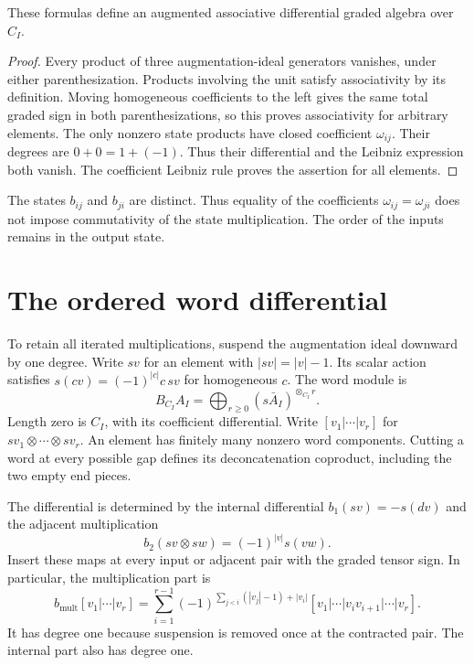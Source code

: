 \begin{proposition}\label{prop:ocb-coefficient-algebra}
These formulas define an augmented associative differential graded
algebra over $C_I$.
\end{proposition}

\begin{proof}
Every product of three augmentation-ideal generators vanishes,
under either parenthesization.
Products involving the unit satisfy associativity by its definition.
Moving homogeneous coefficients to the left gives the same total
graded sign in both parenthesizations, so this proves associativity
for arbitrary elements.
The only nonzero state products have closed coefficient $\omega_{ij}$.
Their degrees are $0+0=1+(-1)$.
Thus their differential and the Leibniz expression both vanish.
The coefficient Leibniz rule proves the assertion for all elements.
\end{proof}

The states $b_{ij}$ and $b_{ji}$ are distinct.
Thus equality of the coefficients $\omega_{ij}=\omega_{ji}$ does
not impose commutativity of the state multiplication.
The order of the inputs remains in the output state.

\section{The ordered word differential}

To retain all iterated multiplications, suspend the augmentation
ideal downward by one degree.
Write $sv$ for an element with $|sv|=|v|-1$.
Its scalar action satisfies
$s(cv)=(-1)^{|c|}c\,sv$ for homogeneous $c$.
The word module is
\[
 B_{C_I}A_I=\bigoplus_{r\ge0}(s\bar A_I)^{\otimes_{C_I}r}.
\]
Length zero is $C_I$, with its coefficient differential.
Write $[v_1|\cdots|v_r]$ for
$sv_1\otimes\cdots\otimes sv_r$.
An element has finitely many nonzero word components.
Cutting a word at every possible gap defines its deconcatenation
coproduct, including the two empty end pieces.

The differential is determined by the internal differential
$b_1(sv)=-s(dv)$ and the adjacent multiplication
\[
 b_2(sv\otimes sw)=(-1)^{|v|}s(vw).
\]
Insert these maps at every input or adjacent pair with the graded
tensor sign. In particular, the multiplication part is
\begin{equation}\label{eq:ocb-bar-faces}
 b_{\mathrm{mult}}[v_1|\cdots|v_r]
 =\sum_{i=1}^{r-1}
 (-1)^{\sum_{j<i}(|v_j|-1)+|v_i|}
 [v_1|\cdots|v_iv_{i+1}|\cdots|v_r].
\end{equation}
It has degree one because suspension is removed once at the
contracted pair. The internal part also has degree one.

